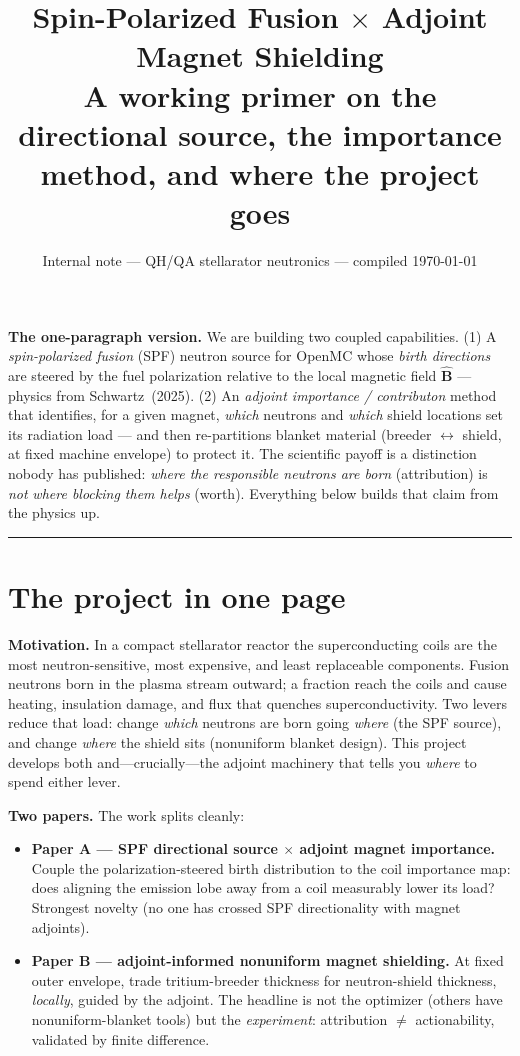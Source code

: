 \documentclass[11pt]{article}
\title{\vspace{-2.5em}\textbf{Spin-Polarized Fusion $\times$ Adjoint Magnet Shielding}\\[0.3em]
\large A working primer on the directional source, the importance method, and where the project goes}
\author{}
\date{\small Internal note --- QH/QA stellarator neutronics --- compiled \today}
\newcommand{\Bhat}{\hat{\mathbf{B}}}
\begin{document}
\maketitle
\vspace{-2.5em}

\begin{key}
\textbf{The one-paragraph version.} We are building two coupled capabilities. (1) A
\emph{spin-polarized fusion} (SPF) neutron source for OpenMC whose \emph{birth directions} are
steered by the fuel polarization relative to the local magnetic field $\Bhat$ --- physics from
Schwartz~(2025). (2) An \emph{adjoint importance / contributon} method that identifies, for a
given magnet, \emph{which} neutrons and \emph{which} shield locations set its radiation load ---
and then re-partitions blanket material (breeder $\leftrightarrow$ shield, at fixed machine
envelope) to protect it. The scientific payoff is a distinction nobody has published:
\emph{where the responsible neutrons are born} (attribution) is \emph{not} \emph{where blocking
them helps} (worth). Everything below builds that claim from the physics up.
\end{key}

\tableofcontents
\medskip
\hrule

\section{The project in one page}

\textbf{Motivation.} In a compact stellarator reactor the superconducting coils are the most
neutron-sensitive, most expensive, and least replaceable components. Fusion neutrons born in the
plasma stream outward; a fraction reach the coils and cause heating, insulation damage, and flux
that quenches superconductivity. Two levers reduce that load: change \emph{which} neutrons are
born going \emph{where} (the SPF source), and change \emph{where} the shield sits (nonuniform
blanket design). This project develops both and---crucially---the adjoint machinery that tells
you \emph{where} to spend either lever.

\textbf{Two papers.} The work splits cleanly:
\begin{itemize}
\item \textbf{Paper A --- SPF directional source $\times$ adjoint magnet importance.} Couple the
  polarization-steered birth distribution to the coil importance map: does aligning the emission
  lobe away from a coil measurably lower its load? Strongest novelty (no one has crossed SPF
  directionality with magnet adjoints).
\item \textbf{Paper B --- adjoint-informed nonuniform magnet shielding.} At fixed outer envelope,
  trade tritium-breeder thickness for neutron-shield thickness, \emph{locally}, guided by the
  adjoint. The headline is not the optimizer (others have nonuniform-blanket tools) but the
  \emph{experiment}: attribution $\neq$ actionability, validated by finite difference.
\end{itemize}
\end{document}
